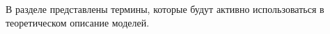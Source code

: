 В разделе представлены термины, которые будут активно использоваться в теоретическом описание моделей.
